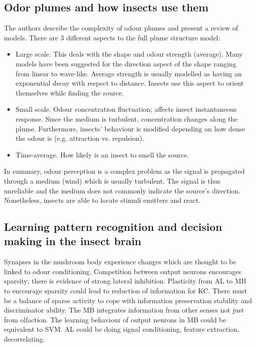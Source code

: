 \documentclass[11pt,a4paper]{article}
\begin{document}
    \subsection{Odor plumes and how insects use them}
    The authors describe the complexity of odour plumes and present a review of models. 
    There are 3 different aspects to the full plume structure model:
    \begin{itemize}
      \item Large scale. 
      This deals with the shape and odour strength (average). 
      Many models have been suggested for the direction aspect of the shape ranging from linear to wave-like. 
      Average strength is usually modelled as having an exponential decay with respect to distance.
      Insects use this aspect to orient themselves while finding the source. 
      
      \item Small scale. Odour concentration fluctuation; affects insect instantaneous response.
      Since the medium is turbulent, concentration changes along the plume. 
      Furthermore, insects' behaviour is modified depending on how dense the odour is (e.g. attraction vs. repulsion). 
      
      \item Time-average. How likely is an insect to smell the source.
      
    \end{itemize}
    In summary, odour perception is a complex problem as the signal is propagated through a medium (wind) which is usually turbulent. 
    The signal is thus unreliable and the medium does not commonly indicate the source's direction.
    Nonetheless, insects are able to locate stimuli emitters and react.

   \subsection{Learning pattern recognition and decision making in the insect brain}
   Synapses in the mushroom body experience changes which are thought to be linked to odour conditioning.
   Competition between output neurons encourages sparsity; there is evidence of strong lateral inhibition.
   Plasticity from AL to MB to encourage sparsity could lead to reduction of information for KC.
   There must be a balance of sparse activity to cope with information preservation stability and discriminator ability.
   The MB integrates information from other senses not just from olfaction.
   The learning behaviour of output neurons in MB could be equivalent to SVM.
   AL could be doing signal conditioning, feature extraction, decorrelating.
\end{document}
